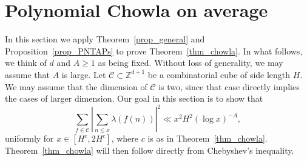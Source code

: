 \documentclass[11pt,letterpaper]{amsart}
\renewcommand{\leq}{\leqslant}
\renewcommand{\geq}{\geqslant}
\theoremstyle{definition}
\numberwithin{equation}{section}
\newcommand{\0}{\mathbf{0}}
\begin{document}
\section{Polynomial Chowla on average}\label{sec:chowla}

In this section we apply Theorem~\ref{prop_general} and Proposition~\ref{prop_PNTAPs} to prove Theorem~\ref{thm_chowla}.
In what follows, we think of $d$ and $A\geq 1$ as being fixed. Without loss of generality, we may assume that $A$ is large. Let $\mathscr{C}\subset \mathbb{Z}^{d+1}$ be a combinatorial cube of side length $H$. We may assume that the dimension of $\mathscr{C}$ is two, since that	 case directly implies the cases of larger dimension.  Our goal in this section is to show that
\begin{equation} \label{eqq20}
\sum_{f\in \mathscr{C}}\left|\sum_{n\leq x}\lambda(f(n))\right|^2\ll x^2H^2(\log x)^{-A},
\end{equation}
uniformly for $x\in [H^{c},2H^{c}]$, where $c$ is as in Theorem~\ref{thm_chowla}. Theorem~\ref{thm_chowla} will then follow directly 
from Chebyshev's inequality.
\end{document}
